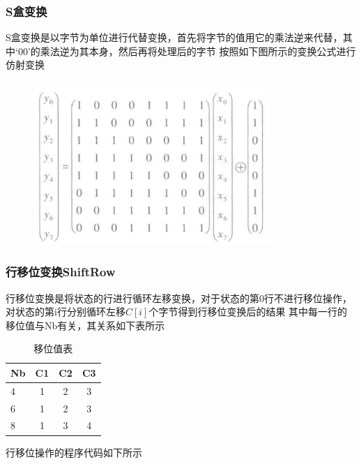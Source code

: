 \documentclass[a4paper,11pt,UTF8]{ctexart}
\newcommand{\bottomcaption}{%
\setlength{\abovecaptionskip}{6pt}%
\setlength{\belowcaptionskip}{6pt}%
\caption}
\newcommand{\xiaowuhao}{\fontsize{9pt}{\baselineskip}\selectfont}   %
\begin{document}
        \subsubsection{S盒变换}
            S盒变换是以字节为单位进行代替变换，首先将字节的值用它的乘法逆来代替，其中‘00’的乘法逆为其本身，然后再将处理后的字节
            按照如下图所示的变换公式进行仿射变换
            \begin{figure}[H]
                \centering
                \includegraphics[width=9cm]{S盒仿射变换.jpg}
                \bottomcaption{\xiaowuhao{S盒仿射变换}}
            \end{figure}
        
        \subsubsection{行移位变换ShiftRow}
            行移位变换是将状态的行进行循环左移变换，对于状态的第0行不进行移位操作，对状态的第i行分别循环左移$C[i]$个字节得到行移位变换后的结果
            其中每一行的移位值与Nb有关，其关系如下表所示
            \begin{table}[H]
                \caption{移位值表}\label{tab1}
                  \centering
                \begin{tabular*}{0.75\textwidth}{@{\extracolsep{\fill}}lccc}
                    \toprule
                    Nb          &C1        &C2         &C3                \\
                    \midrule
                    4             &1                    &2          &3                             \\
                    6             &1                     &2           &3                            \\
                    8             &1                       &3            &4                              \\
                    \bottomrule
                \end{tabular*}
              \end{table}
            行移位操作的程序代码如下所示
            
\end{document}
